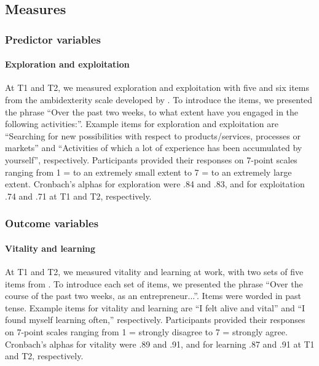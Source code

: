 \documentclass[man, 12pt, a4paper, noextraspace]{apa6}
\begin{document}
\subsection{Measures}
\subsubsection{Predictor variables}
\paragraph{Exploration and exploitation}
At T1 and T2, we measured exploration and exploitation with five and six items from the ambidexterity scale developed by \textcite{Mom.2007}. 
To introduce the items, we presented the phrase “Over the past two weeks, to what extent have you engaged in the following activities:”.
Example items for exploration and exploitation are “Searching for new possibilities with respect to products/services, processes or markets” and “Activities of which a lot of experience has been accumulated by yourself”, respectively. Participants provided their responses on 7-point scales ranging from 1 = to an extremely small extent to 7 = to an extremely large extent.
Cronbach’s alphas for exploration were .84 and .83, and for exploitation .74 and .71 at T1 and T2, respectively.

\subsubsection{Outcome variables}
\paragraph{Vitality and learning}
At T1 and T2, we measured vitality and learning at work, with two sets of five items from \textcite{Porath.2012}.
To introduce each set of items, we presented the phrase “Over the course of the past two weeks, as an entrepreneur...”. Items were worded in past tense. 
Example items for vitality and learning are “I felt alive and vital” and “I found myself learning often,” respectively. 
Participants provided their responses on 7-point scales ranging from 1 = strongly disagree to 7 = strongly agree.
Cronbach’s alphas for vitality were .89 and .91, and for learning .87 and .91 at T1 and T2, respectively.
\end{document}
